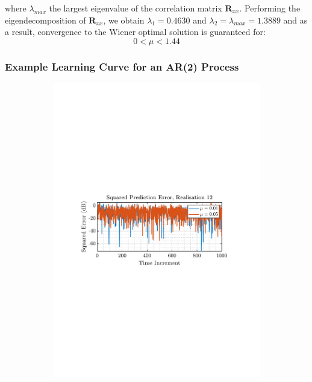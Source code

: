 \documentclass[12pt]{article}
\numberwithin{equation}{section}
\begin{document}
			where $\lambda_{max}$ the largest eigenvalue of the correlation matrix $\mathbf{R}_{xx}$. Performing the eigendecomposition of $\mathbf{R}_{xx}$, we obtain
			$\lambda_{1} = 0.4630$ and $\lambda_{2} = \lambda_{max} = 1.3889$ and as a result, convergence to the Wiener optimal solution is guaranteed for:
			\vspace*{-0.8\baselineskip}
			\begin{equation}
			0 < \mu < 1.44
			\label{eq: 2-1a-cond:mu_max_val}
			\end{equation}
			
		\subsubsection{Example Learning Curve for an AR(2) Process}
		
			\begin{figure}[H]
				\centering
				\begin{subfigure}{0.49\textwidth}
					\centering
					\includegraphics[trim={2.2cm 11.2cm 3.15cm  11.2cm}, clip, width=\textwidth]{../MATLAB/figures/q2_1b_fig01.pdf} 

\end{subfigure}
\end{figure}
\end{document}
